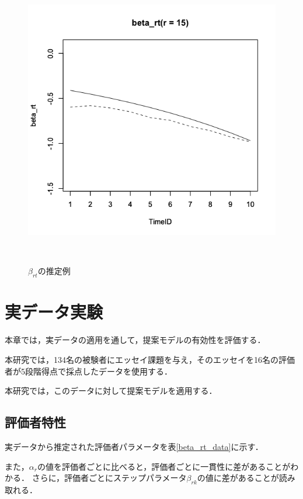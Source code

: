 \documentclass[a4paper,11pt,oneside,openany]{jsbook}
\begin{document}
\begin{figure}[]
\begin{minipage}[tb]{0.3\linewidth}
  \label{ICC2}
 \end{minipage}
 \begin{minipage}[tb]{0.3\linewidth}
  \centering
  \includegraphics[keepaspectratio,scale=0.25]{img/beta_rt_param_15.png}
  \label{ICC3}
 \end{minipage}\\
 \caption{$\beta_{rt}$の推定例}\label{beta_rt_recovery}
\end{figure}

\newpage
\chapter{実データ実験}
本章では，実データの適用を通して，提案モデルの有効性を評価する．

本研究では，134名の被験者にエッセイ課題を与え，そのエッセイを16名の評価者が5段階得点で採点したデータを使用する．

本研究では，このデータに対して提案モデルを適用する．
\section{評価者特性}
実データから推定された評価者パラメータを表\ref{beta_rt_data}に示す．


また，$\alpha_r$の値を評価者ごとに比べると，評価者ごとに一貫性に差があることがわかる．
さらに，評価者ごとにステップパラメータ$\beta_{rk}$の値に差があることが読み取れる．
\end{document}
